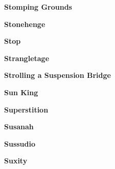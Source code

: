\begin{center}\textbf{Stomping Grounds}\end{center}
\newline
\vspace{10pt} 
\begin{center}\textbf{Stonehenge}\end{center}
\newline
\vspace{10pt} 
\begin{center}\textbf{Stop}\end{center}
\newline
\vspace{10pt} 
\begin{center}\textbf{Strangletage}\end{center}
\newline
\vspace{10pt} 
\begin{center}\textbf{Strolling a Suspension Bridge}\end{center}
\newline
\vspace{10pt} 
\begin{center}\textbf{Sun King}\end{center}
\newline
\vspace{10pt} 
\begin{center}\textbf{Superstition}\end{center}
\newline
\vspace{10pt} 
\begin{center}\textbf{Susanah}\end{center}
\newline
\vspace{10pt} 
\begin{center}\textbf{Sussudio}\end{center}
\newline
\vspace{10pt} 
\begin{center}\textbf{Suxity}\end{center}
\newline
